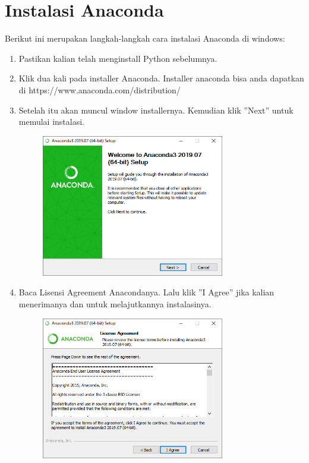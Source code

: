 	\newpage	
	\section{Instalasi Anaconda}
Berikut ini merupakan langkah-langkah cara instalasi Anaconda di windows:
\begin{enumerate}
	\item Pastikan kalian telah menginstall Python sebelumnya.
	\item Klik dua kali pada installer Anaconda. Installer anaconda bisa anda dapatkan di https://www.anaconda.com/distribution/
	\item Setelah itu akan muncul window installernya. Kemudian klik ''Next'' untuk memulai instalasi.
	\begin{figure}[!htbp]
		\includegraphics[width=8cm]{figures/anaconda.PNG}
		\centering
	\end{figure}
    \newpage
	\item Baca Lisensi Agreement Anacondanya. Lalu klik ''I Agree'' jika kalian menerimanya dan untuk melajutkannya instalasinya.
	\begin{figure}[!htbp]
		\includegraphics[width=8cm]{figures/anaconda1.PNG}
		\centering
	\end{figure}


\end{enumerate}
